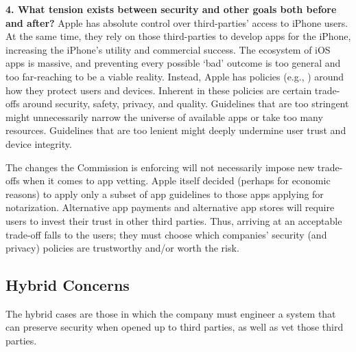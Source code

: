 \documentclass[letterpaper,twocolumn,10pt]{article}
\newcommand{\qfour}{What tension exists between security and other goals
both before and after?\xspace}
\newcommand{\question}[1]{\smallskip \noindent \textbf{{#1}}}
\begin{document}
\question{4. \qfour} 
Apple has absolute control over third-parties' access to iPhone users. At the same time, they rely on those third-parties to develop apps for the iPhone, increasing the iPhone's utility and commercial success.
%
The ecosystem of iOS apps is massive, and preventing every possible `bad' outcome is too general and too far-reaching to be a viable reality.  Instead, Apple has policies (e.g., \cite{apple_app_review}) around how they protect users and devices.  Inherent in these policies are certain trade-offs around security, safety, privacy, and quality.  Guidelines that are too stringent might unnecessarily narrow the universe of available apps or take too many resources.  Guidelines that are too lenient might deeply undermine user trust and device integrity. 

The changes the Commission is enforcing will not necessarily impose new trade-offs when it comes to app vetting.  Apple itself decided (perhaps for economic reasons) to apply only a subset of app guidelines to those apps applying for notarization.  Alternative app payments and alternative app stores will require users to invest their trust in other third parties.  Thus, arriving at an acceptable trade-off falls to the users; they must choose which companies' security (and privacy) policies are trustworthy and/or worth the risk.

\subsection{Hybrid Concerns}
\label{sec:case-studies:hybrid}
The hybrid cases are those in which the company must engineer a system that can preserve security when opened up to third parties, as well as vet those third parties.  


\end{document}
